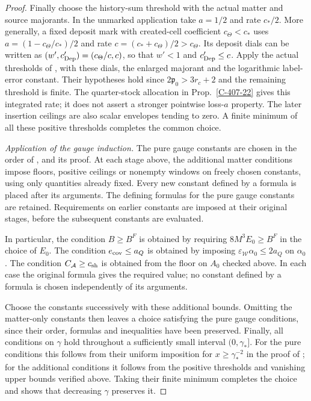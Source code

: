 \documentclass[11pt,letterpaper,reqno]{amsart}
\theoremstyle{definition}
\theoremstyle{remark}
\begin{document}
\begin{proof}
Finally choose the history-sum threshold with the actual
matter and source majorants. In the unmarked application
take $a=1/2$ and rate $c_*/2$. More generally, a fixed
deposit mark with created-cell coefficient $c_\Theta<c_*$
uses $a=(1-c_\Theta/c_*)/2$ and rate
$c=(c_*+c_\Theta)/2>c_\Theta$. Its deposit dials can be
written as $(w',c_{\rm Dep}')=(c_\Theta/c,c)$, so that
$w'<1$ and $c_{\rm Dep}'\le c$. Apply the actual thresholds
of \cite[Prop.~4.160]{YMM1}, with these dials, the enlarged majorant
and the logarithmic label-error constant. Their hypotheses
hold since $2\mathfrak p_0>3r_c+2$ and the remaining
threshold is finite. The quarter-stock allocation in
Prop.~\ref{C-407-22} gives this integrated rate; it
does not assert a stronger pointwise loss-$a$ property.
The later insertion ceilings are also scalar envelopes
tending to zero. A finite minimum of all these positive
thresholds completes the common choice.

\emph{Application of the gauge induction.}
The pure gauge constants are chosen in the order of
\cite[Prop.~4.163]{YMM1}, and its proof.
At each stage above, the additional matter conditions impose
floors, positive ceilings or nonempty windows on freely chosen
constants, using only quantities already fixed. Every new constant
defined by a formula is placed after its arguments. The defining
formulas for the pure gauge constants are retained. Requirements
on earlier constants are imposed at their original stages, before
the subsequent constants are evaluated.

In particular, the condition $B\ge B^F$ is obtained by requiring
$8M^3E_0\ge B^F$ in the choice of $E_0$. The condition
$e_{\rm cov}\le a_Q$ is obtained by imposing
$\varepsilon_{\mathcal W}\alpha_0\le2a_Q$ on $\alpha_0$.
The condition $C_{\mathcal A}\ge c_{\rm sh}$ is obtained from
the floor on $A_0$ checked above. In each case the original
formula gives the required value; no constant defined by a
formula is chosen independently of its arguments.

Choose the constants successively with these additional bounds.
Omitting the matter-only constants then leaves a choice satisfying
the pure gauge conditions, since their order, formulas and
inequalities have been preserved. Finally, all conditions on
$\gamma$ hold throughout a sufficiently small interval
$(0,\gamma_*]$. For the pure conditions this follows from their
uniform imposition for $x\ge\gamma_*^{-2}$ in the proof of
\cite[Prop.~4.163]{YMM1}; for the additional conditions it follows
from the positive thresholds and vanishing upper bounds verified
above. Taking their finite minimum completes the choice and shows
that decreasing $\gamma$ preserves it.


\end{proof}
\end{document}
